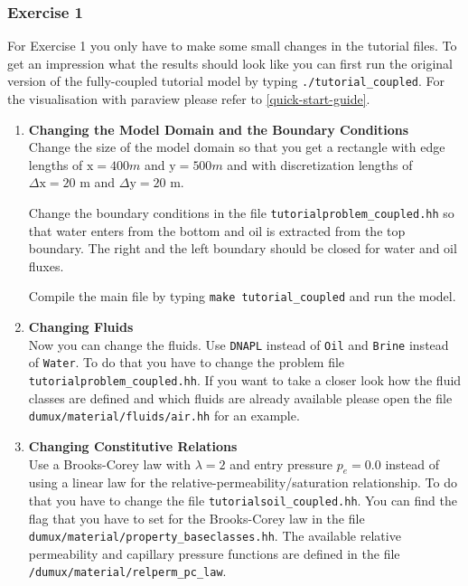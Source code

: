 \subsubsection{Exercise 1}
\renewcommand{\labelenumi}{\alph{enumi})} For Exercise 1 you only have
to make some small changes in the tutorial files.  To get an
impression what the results should look like you can first run the
original version of the fully-coupled tutorial model by typing
\texttt{./tutorial\_coupled}. For the visualisation with paraview
please refer to \ref{quick-start-guide}.
\begin{enumerate}
\item \textbf{Changing the Model Domain and the Boundary Conditions} \\

  Change the size of the model domain so that you get a rectangle with
  edge lengths of $\text{x} = 400 m$ and $\text{y} = 500 m$ and with
  discretization lengths of $\Delta \text{x} = 20$ m and $\Delta
  \text{y} = 20$ m.
  
  Change the boundary conditions in the file
  \texttt{tutorialproblem\_coupled.hh} so that water enters from the
  bottom and oil is extracted from the top boundary. The right and the
  left boundary should be closed for water and oil fluxes. 

  Compile the main file by typing \texttt{make tutorial\_coupled} and
  run the model.


\item \textbf{Changing Fluids} \\
  Now you can change the fluids. Use \texttt{DNAPL} instead of
  \texttt{Oil} and \texttt{Brine} instead of \texttt{Water}. To do
  that you have to change the problem file
  \texttt{tutorialproblem\_coupled.hh}. If you want to take a closer
  look how the fluid classes are defined and which fluids are already
  available please open the file \texttt{dumux/material/fluids/air.hh}
  for an example.


\item \textbf{Changing Constitutive Relations} \\
  Use a Brooks-Corey law with $\lambda = 2$ and entry pressure $p_e =
  0.0$ instead of using a linear law for the
  relative-permeability/saturation relationship. To do that you have
  to change the file \texttt{tutorialsoil\_coupled.hh}. You can find
  the flag that you have to set for the Brooks-Corey law in the file
  \texttt{dumux/material/property\_baseclasses.hh}.  The available
  relative permeability and capillary pressure functions are defined
  in the file \texttt{/dumux/material/relperm\_pc\_law}.
 

\end{enumerate}
